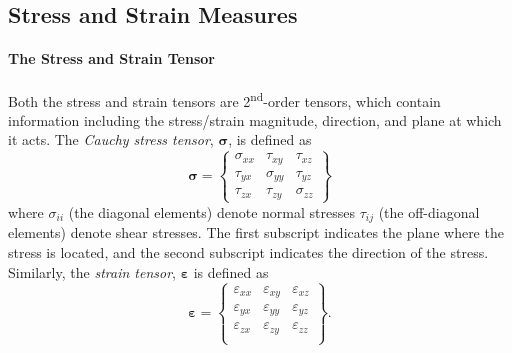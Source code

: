 \documentclass[12pt, a4paper]{article}
\numberwithin{equation}{section}
\begin{document}
\subsection{Stress and Strain Measures}

\paragraph{The Stress and Strain Tensor}
Both the stress and strain tensors are 2\textsuperscript{nd}-order tensors, which contain information including the stress/strain magnitude, direction, and plane at which it acts. The \textit{Cauchy stress tensor}, $\boldsymbol{\sigma}$, is defined as
\begin{equation}
\label{eqn:Cauchy}
    \boldsymbol{\sigma} = 
    \begin{Bmatrix}
        \sigma_{xx} & \tau_{xy} & \tau_{xz} \\
        \tau_{yx} & \sigma_{yy} & \tau_{yz} \\
        \tau_{zx} & \tau_{zy} & \sigma_{zz} 
    \end{Bmatrix}
\end{equation}
where $\sigma_{ii}$ (the diagonal elements) denote normal stresses $\tau_{ij}$ (the off-diagonal elements) denote shear stresses. The first subscript indicates the plane where the stress is located, and the second subscript indicates the direction of the stress.\\

Similarly, the \textit{strain tensor}, $\boldsymbol{\varepsilon}$ is defined as
\begin{equation}
    \boldsymbol{\varepsilon} = 
    \begin{Bmatrix}
        \varepsilon_{xx} & \varepsilon_{xy} & \varepsilon_{xz} \\
        \varepsilon_{yx} & \varepsilon_{yy} & \varepsilon_{yz} \\
        \varepsilon_{zx} & \varepsilon_{zy} & \varepsilon_{zz} \\
    \end{Bmatrix}.
\end{equation}
\end{document}
